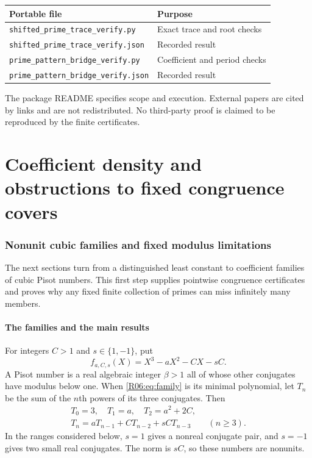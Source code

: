 \documentclass[11pt,a4paper]{article}
\theoremstyle{definition}\newtheorem{definition}[theorem]{Definition}
\theoremstyle{remark}\newtheorem{remark}[theorem]{Remark}
\begin{document}
\begin{center}
\begin{tabular}{ll}
\toprule
Portable file & Purpose\\
\midrule
\texttt{shifted\_prime\_trace\_verify.py} & Exact trace and root checks\\
\texttt{shifted\_prime\_trace\_verify.json} & Recorded result\\
\texttt{prime\_pattern\_bridge\_verify.py} & Coefficient and period checks\\
\texttt{prime\_pattern\_bridge\_verify.json} & Recorded result\\
\bottomrule
\end{tabular}
\end{center}
The package README specifies scope and execution. External papers are
cited by links and are not redistributed. No third-party proof is
claimed to be reproduced by the finite certificates.



\endgroup

\clearpage\part{Coefficient density and obstructions to fixed congruence covers}

\section{Nonunit cubic families and fixed modulus limitations}\label{src:R06}
The next sections turn from a distinguished least constant to coefficient families of cubic Pisot numbers. This first step supplies pointwise congruence certificates and proves why any fixed finite collection of primes can miss infinitely many members.
\medskip
\begingroup



\subsection{The families and the main results}

For integers $C>1$ and $s\in\{1,-1\}$, put
\begin{equation}\label{R06:eq:family}
 f_{a,C,s}(X)=X^3-aX^2-CX-sC.
\end{equation}
A Pisot number is a real algebraic integer $\beta>1$ all of whose
other conjugates have modulus below one. When \eqref{R06:eq:family}
is its minimal polynomial, let $T_n$ be the sum of the $n$th powers
of its three conjugates. Then
\begin{equation}\label{R06:eq:traces}
 \begin{gathered}
 T_0=3,\quad T_1=a,\quad T_2=a^2+2C,\\
 T_n=aT_{n-1}+CT_{n-2}+sCT_{n-3}\qquad(n\ge3).
 \end{gathered}
\end{equation}
In the ranges considered below, $s=1$ gives a nonreal conjugate pair,
and $s=-1$ gives two small real conjugates. The norm is $sC$, so
these numbers are nonunits.
\end{document}
